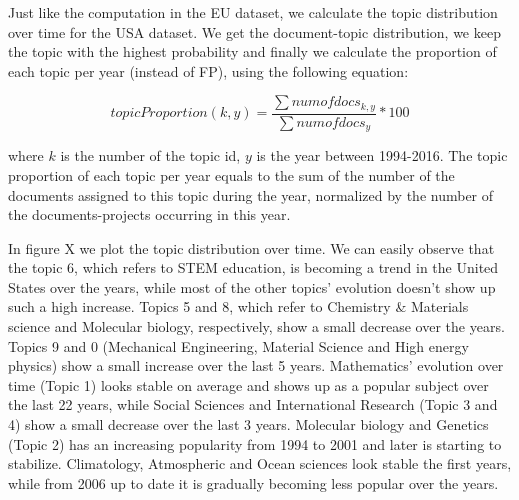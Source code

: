 \documentclass[12pt]{report}
\begin{document}
Just like the computation in the EU dataset, we calculate the topic 
distribution over time for the USA dataset. We get the document-topic 
distribution, we keep the topic with the highest probability and finally 
we calculate the proportion of each topic per
year (instead of FP), using the following equation:

\begin{equation}
topicProportion(k, y) = \frac{\sum num of docs_{k,y}}{\sum num of docs_{y}} * 100
\end{equation}

where $k$ is the number of the topic id, $y$ is the year between 1994-2016. The
topic proportion of each topic per year equals to the sum of the number of the
documents assigned to this topic during the year, normalized by the number of
the documents-projects  occurring in this year.

In figure X we plot the topic distribution over time. We can easily observe that
the topic 6, which refers to STEM education, is becoming a trend in the United
States over the years, while most of the other topics' evolution doesn't show up
such a high increase. Topics 5 and 8, which refer to Chemistry \& Materials
science and Molecular biology, respectively, show a small decrease over the
years. Topics 9 and 0 (Mechanical Engineering, Material Science and High energy
physics) show a small increase over the last 5 years. Mathematics' evolution
over time (Topic 1) looks stable on average and shows up as a popular subject
over the last 22 years, while Social Sciences and International Research (Topic
3 and 4) show a small decrease over the last 3 years.  Molecular biology and
Genetics (Topic 2) has an increasing popularity from 1994 to 2001 and later is
starting to stabilize. Climatology, Atmospheric and Ocean sciences look stable
the first years, while from 2006 up to date it is gradually becoming less
popular over the years.
\end{document}
